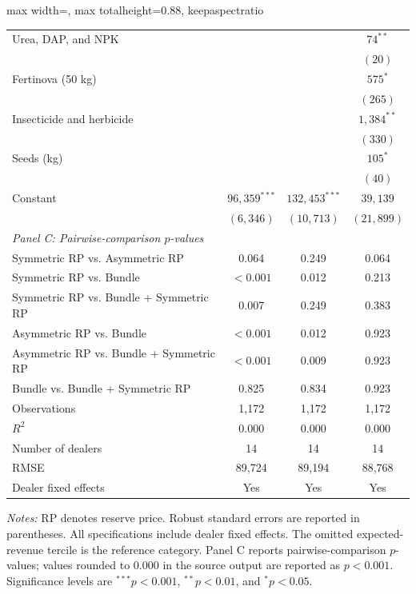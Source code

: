 \documentclass[11pt]{article}
\begin{document}
\begin{table}[!htbp]
\begin{adjustbox}{max width=\textwidth,
                  max totalheight=0.88\textheight,
                  keepaspectratio}
\begin{threeparttable}
\begin{tabular}{lccc}
Urea, DAP, and NPK
    & & & $74^{**}$ \\
    & & & $(20)$ \\

Fertinova (50 kg)
    & & & $575^{*}$ \\
    & & & $(265)$ \\

Insecticide and herbicide
    & & & $1{,}384^{**}$ \\
    & & & $(330)$ \\

Seeds (kg)
    & & & $105^{*}$ \\
    & & & $(40)$ \\

\addlinespace
Constant
    & $96{,}359^{***}$ & $132{,}453^{***}$ & $39{,}139$ \\
    & $(6{,}346)$ & $(10{,}713)$ & $(21{,}899)$ \\

\midrule
\multicolumn{4}{l}{\textit{Panel C: Pairwise-comparison $p$-values}} \\[2pt]

Symmetric RP vs. Asymmetric RP
    & 0.064 & 0.249 & 0.064 \\
Symmetric RP vs. Bundle
    & $<0.001$ & 0.012 & 0.213 \\
Symmetric RP vs. Bundle + Symmetric RP
    & 0.007 & 0.249 & 0.383 \\
Asymmetric RP vs. Bundle
    & $<0.001$ & 0.012 & 0.923 \\
Asymmetric RP vs. Bundle + Symmetric RP
    & $<0.001$ & 0.009 & 0.923 \\
Bundle vs. Bundle + Symmetric RP
    & 0.825 & 0.834 & 0.923 \\

\midrule
Observations
    & 1,172 & 1,172 & 1,172 \\
$R^{2}$
    & 0.000 & 0.000 & 0.000 \\
Number of dealers
    & 14 & 14 & 14 \\
RMSE
    & 89,724 & 89,194 & 88,768 \\
Dealer fixed effects
    & Yes & Yes & Yes \\
\bottomrule
\end{tabular}

\begin{tablenotes}[flushleft]
\footnotesize
\item \textit{Notes:} RP denotes reserve price. Robust standard errors are
reported in parentheses. All specifications include dealer fixed effects.
The omitted expected-revenue tercile is the reference category. Panel C
reports pairwise-comparison $p$-values; values rounded to 0.000 in the source
output are reported as $p<0.001$. Significance levels are
$^{***}p<0.001$, $^{**}p<0.01$, and $^{*}p<0.05$.
\end{tablenotes}

\end{threeparttable}
\end{adjustbox}
\end{table}
\end{document}
